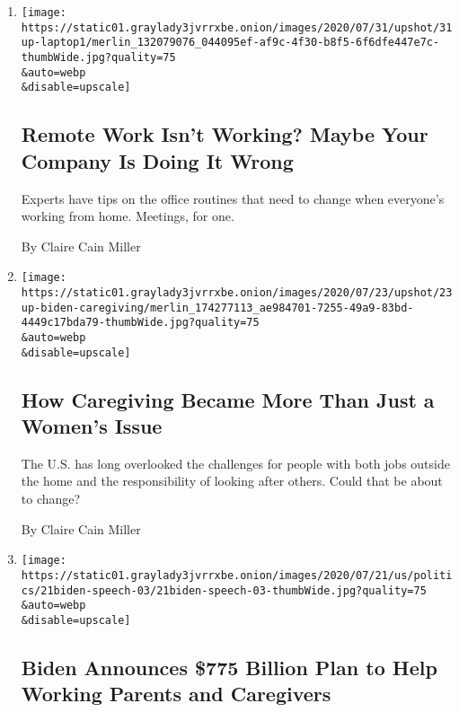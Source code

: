 \begin{enumerate}
\def\labelenumi{\arabic{enumi}.}
\item
  \href{/2020/07/31/upshot/remote-work-tips.html}{}

  \texttt{[image: https://static01.graylady3jvrrxbe.onion/images/2020/07/31/upshot/31up-laptop1/merlin\_132079076\_044095ef-af9c-4f30-b8f5-6f6dfe447e7c-thumbWide.jpg?quality=75\\\&auto=webp\\\&disable=upscale]}

  \hypertarget{remote-work-isnt-working-maybe-your-company-is-doing-it-wrong}{%
  \subsection{Remote Work Isn't Working? Maybe Your Company Is Doing It
  Wrong}\label{remote-work-isnt-working-maybe-your-company-is-doing-it-wrong}}

  Experts have tips on the office routines that need to change when
  everyone's working from home. Meetings, for one.

  By Claire Cain Miller
\item
  \href{/2020/07/23/upshot/biden-caregiving-plan.html}{}

  \texttt{[image: https://static01.graylady3jvrrxbe.onion/images/2020/07/23/upshot/23up-biden-caregiving/merlin\_174277113\_ae984701-7255-49a9-83bd-4449c17bda79-thumbWide.jpg?quality=75\\\&auto=webp\\\&disable=upscale]}

  \hypertarget{how-caregiving-became-more-than-just-a-womens-issue}{%
  \subsection{How Caregiving Became More Than Just a Women's
  Issue}\label{how-caregiving-became-more-than-just-a-womens-issue}}

  The U.S. has long overlooked the challenges for people with both jobs
  outside the home and the responsibility of looking after others. Could
  that be about to change?

  By Claire Cain Miller
\item
  \href{/2020/07/21/us/politics/biden-workplace-childcare.html}{}

  \texttt{[image: https://static01.graylady3jvrrxbe.onion/images/2020/07/21/us/politics/21biden-speech-03/21biden-speech-03-thumbWide.jpg?quality=75\\\&auto=webp\\\&disable=upscale]}

  \hypertarget{biden-announces-775-billion-plan-to-help-working-parents-and-caregivers}{%
  \subsection{Biden Announces \$775 Billion Plan to Help Working Parents
  and
  Caregivers}\label{biden-announces-775-billion-plan-to-help-working-parents-and-caregivers}}


\end{enumerate}
